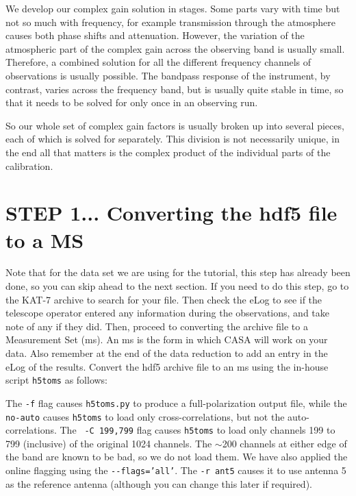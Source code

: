 \documentclass[force,almostfull,justified]{tufte-book}
\begin{document}
We develop our complex gain solution in stages.  Some parts vary with time but not so much with
frequency, for example transmission through the atmosphere causes both phase shifts and attenuation.
However, the variation of the atmospheric part of the complex gain across the observing band is
usually small.  Therefore, a combined solution for all the different frequency channels of
observations is usually possible.  The bandpass response of the instrument, by contrast, varies across
the frequency band, but is usually quite stable in time, so that it needs to be solved for only once
in an observing run.

So our whole set of complex gain factors is usually broken up into several pieces, each of which is
solved for separately.  This division is not necessarily unique, in the end all that matters is the
complex product of the individual parts of the calibration.

%

\bigskip
\section{STEP 1... Converting the hdf5 file to a MS}

Note that for the data set we are using for the tutorial, this step has already been done, so you can
skip ahead to the next section.  If you need to do this step, go to the KAT-7 archive to search for
your file.  Then check the eLog to see if the telescope operator entered any information during the
observations, and take note of any if they did.  Then, proceed to converting the archive file to a
Measurement Set (ms).  An ms is the form in which CASA will work on your data.  Also remember at the
end of the data reduction to add an entry in the eLog of the results.  Convert the hdf5 archive file
to an ms using the in-house script {\tt h5toms} as follows:

\bigskip
{}

The {\tt -f} flag causes {\tt h5toms.py} to produce a full-polarization output file, while the {\tt
no-auto} causes {\tt h5toms} to load only cross-correlations, but not the auto-correlations.  The {\tt
-C 199,799} flag causes {\tt h5toms} to load only channels 199 to 799 (inclusive) of the original 1024
channels. The $\sim$200 channels at either edge of the band are known to be bad, so we do not load
them.  We have also applied the online flagging using the {\tt -{-}flags='all'}.  The {\tt -r ant5}
causes it to use antenna 5 as the reference antenna (although you can change this later if required).
\end{document}
